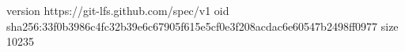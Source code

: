 version https://git-lfs.github.com/spec/v1
oid sha256:33f0b3986c4fc32b39e6c67905f615e5cf0e3f208acdac6e60547b2498ff0977
size 10235
